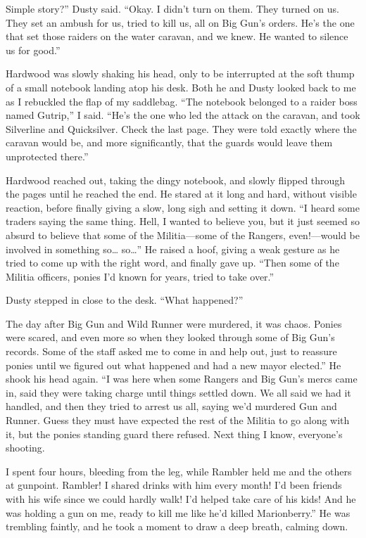 \leavevmode{}Simple story?” Dusty said. “Okay. I didn’t turn on them. They turned on us. They set an ambush for us, tried to kill us, all on Big Gun’s orders. He’s the one that set those raiders on the water caravan, and we knew. He wanted to silence us for good.”

Hardwood was slowly shaking his head, only to be interrupted at the soft thump of a small notebook landing atop his desk. Both he and Dusty looked back to me as I rebuckled the flap of my saddlebag. “The notebook belonged to a raider boss named Gutrip,” I said. “He’s the one who led the attack on the caravan, and took Silverline and Quicksilver. Check the last page. They were told exactly where the caravan would be, and more significantly, that the guards would leave them unprotected there.”

Hardwood reached out, taking the dingy notebook, and slowly flipped through the pages until he reached the end. He stared at it long and hard, without visible reaction, before finally giving a slow, long sigh and setting it down. “I heard some traders saying the same thing. Hell, I wanted to believe you, but it just seemed so absurd to believe that some of the Militia—some of the Rangers, even!—would be involved in something so… so…” He raised a hoof, giving a weak gesture as he tried to come up with the right word, and finally gave up. “Then some of the Militia officers, ponies I’d known for years, tried to take over.”

Dusty stepped in close to the desk. “What happened?”

\leavevmode{}The day after Big Gun and Wild Runner were murdered, it was chaos. Ponies were scared, and even more so when they looked through some of Big Gun’s records. Some of the staff asked me to come in and help out, just to reassure ponies until we figured out what happened and had a new mayor elected.” He shook his head again. “I was here when some Rangers and Big Gun’s mercs came in, said they were taking charge until things settled down. We all said we had it handled, and then they tried to arrest us all, saying we’d murdered Gun and Runner. Guess they must have expected the rest of the Militia to go along with it, but the ponies standing guard there refused. Next thing I know, everyone’s shooting.

\leavevmode{}I spent four hours, bleeding from the leg, while Rambler held me and the others at gunpoint. Rambler! I shared drinks with him every month! I’d been friends with his wife since we could hardly walk! I’d helped take care of his kids! And he was holding a gun on me, ready to kill me like he’d killed Marionberry.” He was trembling faintly, and he took a moment to draw a deep breath, calming down.

